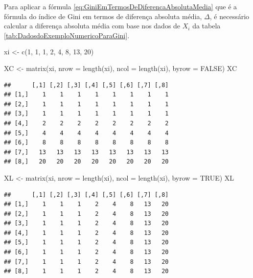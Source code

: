 \documentclass[
]{book}
\newenvironment{Shaded}{\begin{snugshade}}{\end{snugshade}}
\newcommand{\AttributeTok}[1]{\textcolor[rgb]{0.77,0.63,0.00}{#1}}
\newcommand{\ConstantTok}[1]{\textcolor[rgb]{0.00,0.00,0.00}{#1}}
\newcommand{\DecValTok}[1]{\textcolor[rgb]{0.00,0.00,0.81}{#1}}
\newcommand{\FunctionTok}[1]{\textcolor[rgb]{0.00,0.00,0.00}{#1}}
\newcommand{\NormalTok}[1]{#1}
\newcommand{\OtherTok}[1]{\textcolor[rgb]{0.56,0.35,0.01}{#1}}
\begin{document}
Para aplicar a fórmula \eqref{eq:GiniEmTermosDeDiferencaAbsolutaMedia} que é a fórmula do índice de Gini em termos de diferença absoluta média, \(\Delta\), é necessário calcular a diferença absoluta média com base nos dados de \(X_i\) da tabela \ref{tab:DadosdoExemploNumericoParaGini}.

\begin{Shaded}
\begin{Highlighting}[]
\NormalTok{xi }\OtherTok{\textless{}{-}} \FunctionTok{c}\NormalTok{(}\DecValTok{1}\NormalTok{, }\DecValTok{1}\NormalTok{, }\DecValTok{1}\NormalTok{, }\DecValTok{2}\NormalTok{, }\DecValTok{4}\NormalTok{, }\DecValTok{8}\NormalTok{, }\DecValTok{13}\NormalTok{, }\DecValTok{20}\NormalTok{)}

\NormalTok{XC }\OtherTok{\textless{}{-}} \FunctionTok{matrix}\NormalTok{(xi, }\AttributeTok{nrow =} \FunctionTok{length}\NormalTok{(xi), }\AttributeTok{ncol =} \FunctionTok{length}\NormalTok{(xi), }
    \AttributeTok{byrow =} \ConstantTok{FALSE}\NormalTok{)}
\NormalTok{XC}
\end{Highlighting}
\end{Shaded}

\begin{verbatim}
##      [,1] [,2] [,3] [,4] [,5] [,6] [,7] [,8]
## [1,]    1    1    1    1    1    1    1    1
## [2,]    1    1    1    1    1    1    1    1
## [3,]    1    1    1    1    1    1    1    1
## [4,]    2    2    2    2    2    2    2    2
## [5,]    4    4    4    4    4    4    4    4
## [6,]    8    8    8    8    8    8    8    8
## [7,]   13   13   13   13   13   13   13   13
## [8,]   20   20   20   20   20   20   20   20
\end{verbatim}

\begin{Shaded}
\begin{Highlighting}[]
\NormalTok{XL }\OtherTok{\textless{}{-}} \FunctionTok{matrix}\NormalTok{(xi, }\AttributeTok{nrow =} \FunctionTok{length}\NormalTok{(xi), }\AttributeTok{ncol =} \FunctionTok{length}\NormalTok{(xi), }
    \AttributeTok{byrow =} \ConstantTok{TRUE}\NormalTok{)}
\NormalTok{XL}
\end{Highlighting}
\end{Shaded}

\begin{verbatim}
##      [,1] [,2] [,3] [,4] [,5] [,6] [,7] [,8]
## [1,]    1    1    1    2    4    8   13   20
## [2,]    1    1    1    2    4    8   13   20
## [3,]    1    1    1    2    4    8   13   20
## [4,]    1    1    1    2    4    8   13   20
## [5,]    1    1    1    2    4    8   13   20
## [6,]    1    1    1    2    4    8   13   20
## [7,]    1    1    1    2    4    8   13   20
## [8,]    1    1    1    2    4    8   13   20
\end{verbatim}
\end{document}
